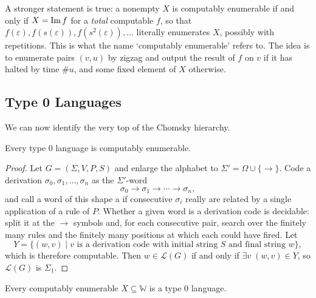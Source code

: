 \documentclass[a4paper]{scrartcl}
\newcommand{\WW}{\mathbb{W}}
\newcommand{\lang}{\mathcal{L}}
\newcommand{\eps}{\varepsilon}
\begin{document}
\begin{remark}
	A stronger statement is true: a nonempty $X$ is computably enumerable if and only if $X = \operatorname{Im} f$ for a \emph{total} computable $f$, so that $f(\eps), f(s(\eps)), f(s^2(\eps)), \dots$ literally enumerates $X$, possibly with repetitions. This is what the name `computably enumerable' refers to. The idea is to enumerate pairs $(v,u)$ by zigzag and output the result of $f$ on $v$ if it has halted by time $\#u$, and some fixed element of $X$ otherwise.
\end{remark}

\subsection{Type 0 Languages}

We can now identify the very top of the Chomsky hierarchy.

\begin{theorem}\label{thm:type0ce}
	Every type $0$ language is computably enumerable.
\end{theorem}

\begin{proof}
	Let $G = (\Sigma,V,P,S)$ and enlarge the alphabet to $\Sigma' = \Omega \cup \{\bm\to\}$. Code a derivation $\sigma_0, \sigma_1, \dots, \sigma_n$ as the $\Sigma'$-word
	$$\sigma_0 \bm\to \sigma_1 \bm\to \cdots \bm\to \sigma_n,$$
	and call a word of this shape a  if consecutive $\sigma_i$ really are related by a single application of a rule of $P$. Whether a given word is a derivation code is decidable: split it at the $\bm\to$ symbols and, for each consecutive pair, search over the finitely many rules and the finitely many positions at which each could have fired. Let
	$$Y = \{(w,v) \mid v \text{ is a derivation code with initial string } S \text{ and final string } w\},$$
	which is therefore computable. Then $w \in \lang(G)$ if and only if $\exists v\; (w,v)\in Y$, so $\lang(G)$ is $\Sigma_1$.
\end{proof}

\begin{theorem}\label{thm:cetype0}
	Every computably enumerable $X \subseteq \WW$ is a type $0$ language.
\end{theorem}
\end{document}
